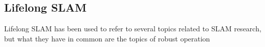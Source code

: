 \subsection{Lifelong SLAM}

Lifelong SLAM has been used to refer to several topics related to SLAM research, but what they have in common are the topics of robust operation